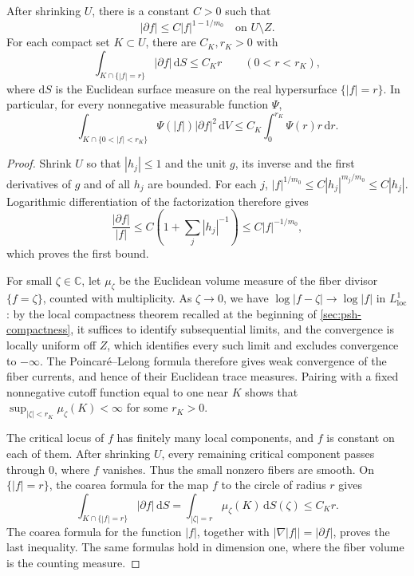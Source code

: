 \begin{lemma}\label{lem:holomorphic-small-level-energy}
After shrinking $U$, there is a constant $C>0$ such that
\[
 |\partial f|\leq C|f|^{1-1/m_0}\quad\text{on }U\setminus Z.
\]
For each compact set $K\subset U$, there are $C_K,r_K>0$ with
\[
 \int_{K\cap\{|f|=r\}}|\partial f|\,\mathrm dS\leq C_Kr
 \qquad(0<r<r_K),
\]
where $\mathrm dS$ is the Euclidean surface measure on the real hypersurface $\{|f|=r\}$. In particular, for every nonnegative measurable function $\Psi$,
\[
 \int_{K\cap\{0<|f|<r_K\}}\Psi(|f|)|\partial f|^2\,\mathrm dV
 \leq C_K\int_0^{r_K}\Psi(r)r\,\mathrm dr.
\]
\end{lemma}
\begin{proof}
Shrink $U$ so that $|h_j|\leq1$ and the unit $g$, its inverse and the first derivatives of $g$ and of all $h_j$ are bounded. For each $j$,
$|f|^{1/m_0}\leq C|h_j|^{m_j/m_0}\leq C|h_j|$.
Logarithmic differentiation of the factorization therefore gives
\[
 \frac{|\partial f|}{|f|}
 \leq C\left(1+\sum_j|h_j|^{-1}\right)
 \leq C|f|^{-1/m_0},
\]
which proves the first bound.

For small $\zeta\in\mathbb C$, let $\mu_\zeta$ be the Euclidean volume measure of the fiber divisor $\{f=\zeta\}$, counted with multiplicity. As $\zeta\to0$, we have $\log|f-\zeta|\to\log|f|$ in $L^1_{\mathrm{loc}}$: by the local compactness theorem recalled at the beginning of \cref{sec:psh-compactness}, it suffices to identify subsequential limits, and the convergence is locally uniform off $Z$, which identifies every such limit and excludes convergence to $-\infty$. The Poincar\'e--Lelong formula therefore gives weak convergence of the fiber currents, and hence of their Euclidean trace measures. Pairing with a fixed nonnegative cutoff function equal to one near $K$ shows that $\sup_{|\zeta|<r_K}\mu_\zeta(K)<\infty$ for some $r_K>0$.

The critical locus of $f$ has finitely many local components, and $f$ is constant on each of them. After shrinking $U$, every remaining critical component passes through $0$, where $f$ vanishes. Thus the small nonzero fibers are smooth. On $\{|f|=r\}$, the coarea formula for the map $f$ to the circle of radius $r$ gives
\[
 \int_{K\cap\{|f|=r\}}|\partial f|\,\mathrm dS
 =\int_{|\zeta|=r}\mu_\zeta(K)\,\mathrm dS(\zeta)
 \leq C_Kr.
\]
The coarea formula for the function $|f|$, together with $|\nabla|f||=|\partial f|$, proves the last inequality. The same formulas hold in dimension one, where the fiber volume is the counting measure.
\end{proof}

